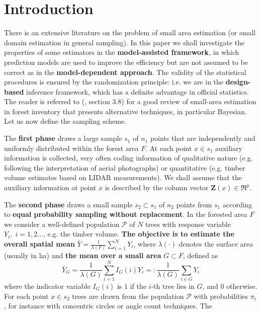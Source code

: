 \documentclass[a4paper,12pt,leqno, titlepage]{article}
\begin{document}
\section{Introduction}\label{introduction}
 \setcounter{page}{1}
There is an extensive literature on the problem of small area estimation (or small domain estimation in general sampling). In this paper we shall investigate the properties of some estimators in the \textbf{model-assisted framework}, in which prediction models are used to improve the efficiency but are not assumed to be correct as in the \textbf{model-dependent approach}. The validity of the statistical procedures is ensured by the randomization principle: i.e. we are in the \textbf{design-based} inference framework, which has a definite advantage in official statistics. The reader is referred to (\cite{koehl}, section 3.8) for a good review of small-area estimation in forest inventory that presents alternative techniques, in particular Bayesian. Let us now define the sampling scheme.\par
The \textbf{first phase} draws a large sample $s_1$ of $n_1$ points that are independently and uniformly distributed within the forest area $F$. At each point $x\in{s}_1$ auxiliary
information is collected, very often coding information of qualitative nature
(e.g. following the  interpretation of aerial photographs) or quantitative (e.g. timber volume estimates  based on LIDAR measurements). We shall assume that the auxiliary information at point $x$ is described by the column vector $\mathbf{Z}(x)\in{\Re^{p}}$. \par
 The \textbf{second phase} draws a small sample $s_2\subset{s_1}$ of
$n_2$ points from $s_1$ according to \textbf{equal probability
sampling without replacement}. In the forested area $F$ we consider a well-defined population $ \mathcal{P}$ of $N$ trees with response variable
 $Y_i,\;i=1,2 \ldots$, e.g. the timber volume.  \textbf{The objective is to estimate the overall spatial mean}  $\bar{Y}=\frac{1}{\lambda(F)}\sum_{i=1}^NY_i$, where $\lambda(\cdot)$ denotes the surface area (usually in ha) and \textbf{the mean over a small area} $G\subset F$, defined as
 \begin{equation}\label{small1}
 \bar{Y}_G=\frac{1}{\lambda(G)}\sum_{i=1}^N I_G(i)Y_i=:\frac{1}{\lambda(G)}\sum_{i\in{G}}Y_i
 \end{equation}
 where the indicator variable $I_G(i)$ is $1$ if the $i$-th tree lies in $G$, and $0$ otherwise.\\
 For each point $x\in{s_2}$ trees are drawn from the population $\mathcal{P}$ with probabilities $\pi_i$, for instance with concentric circles or angle count techniques. The
\end{document}
